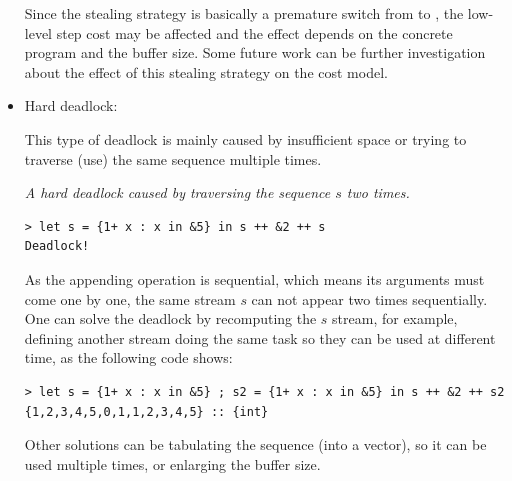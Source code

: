 \begin{itemize}
Since the stealing strategy is basically a premature
switch from \filling to \draining, the low-level step cost may be affected and the effect depends on the concrete program and the buffer size. 
Some future work can be further investigation about the effect of this stealing strategy on the cost model.\\


\item Hard deadlock: 

This type of deadlock is mainly caused by insufficient space or trying to traverse (use) the same sequence multiple times. 

\begin{example} \emph{A hard deadlock caused by traversing the sequence $s$ two times.} \label{eg:deadlock1}
\end{example}
\begin{lstlisting}[style=nesl-style]
> let s = {1+ x : x in &5} in s ++ &2 ++ s
Deadlock!
\end{lstlisting}
As the appending operation is sequential, which means its arguments must come one by one, the same stream $s$ can not appear two times sequentially.
One can solve the deadlock by recomputing the $s$ stream, for example,  defining another stream doing the same task so they can be used at different time, as the following code shows:\\
\begin{lstlisting}[style=nesl-style]
> let s = {1+ x : x in &5} ; s2 = {1+ x : x in &5} in s ++ &2 ++ s2
{1,2,3,4,5,0,1,1,2,3,4,5} :: {int}
\end{lstlisting}

Other solutions can be tabulating the sequence (into a vector), so it can be used multiple times, or enlarging the buffer size. 

%
% 
%
%  
%
%
%


\end{itemize}


